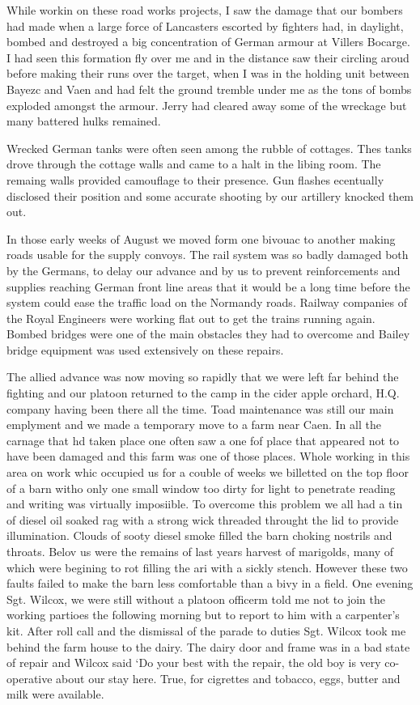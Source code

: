 While workin on these road works projects, I saw the damage that our
bombers had made when a large force of Lancasters escorted by fighters
had, in daylight, bombed and destroyed a big concentration of German
armour at Villers Bocarge. I had seen this formation fly over me and
in the distance saw their circling aroud before making their runs over
the target, when I was in the holding unit between Bayezc and Vaen and
had felt the ground tremble under me as the tons of bombs exploded
amongst the armour. Jerry had cleared away some of the wreckage but
many battered hulks remained.

Wrecked German tanks were often seen among the rubble of
cottages. Thes tanks drove through the cottage walls and came to a
halt in the libing room. The remaing walls provided camouflage to
their presence. Gun flashes ecentually disclosed their position and
some accurate shooting by our artillery knocked them out.

In those early weeks of August we moved form one bivouac to another
making roads usable for the supply convoys. The rail system was so
badly damaged both by the Germans, to delay our advance and by us to
prevent reinforcements and supplies reaching German front line areas
that it would be a long time before the system could ease the traffic
load on the Normandy roads. Railway companies of the Royal Engineers
were working flat out to get the trains running again. Bombed bridges
were one of the main obstacles they had to overcome and Bailey bridge
equipment was used extensively on these repairs.

The allied advance was now moving so rapidly that we were left far
behind the fighting and our platoon returned to the camp in the cider
apple orchard, H.Q. company having been there all the time. Toad
maintenance was still our main emplyment and we made a temporary move
to a farm near Caen. In all the carnage that hd taken place one often
saw a one fof place that appeared not to have been damaged and this
farm was one of those places. Whole working in this area on work whic
occupied us for a couble of weeks we billetted on the top floor of a
barn witho only one small window too dirty for light to penetrate
reading and writing was virtually imposiible. To overcome this problem
we all had a tin of diesel oil soaked rag with a strong wick threaded
throught the lid to provide illumination. Clouds of sooty diesel smoke
filled the barn choking nostrils and throats. Belov us were the
remains of last years harvest of marigolds, many of which were
begining to rot filling the ari with a sickly stench. However these
two faults failed to make the barn less comfortable than a bivy in a
field. One evening Sgt. Wilcox, we were still without a platoon
officerm told me not to join the working partioes the following
morning but to report to him with a carpenter's kit. After roll call
and the dismissal of the parade to duties Sgt. Wilcox took me behind
the farm house to the dairy. The dairy door and frame was in a bad
state of repair and Wilcox said `Do your best with the repair, the old
boy is very co-operative about our stay here. True, for cigrettes and
tobacco, eggs, butter and milk were available.

